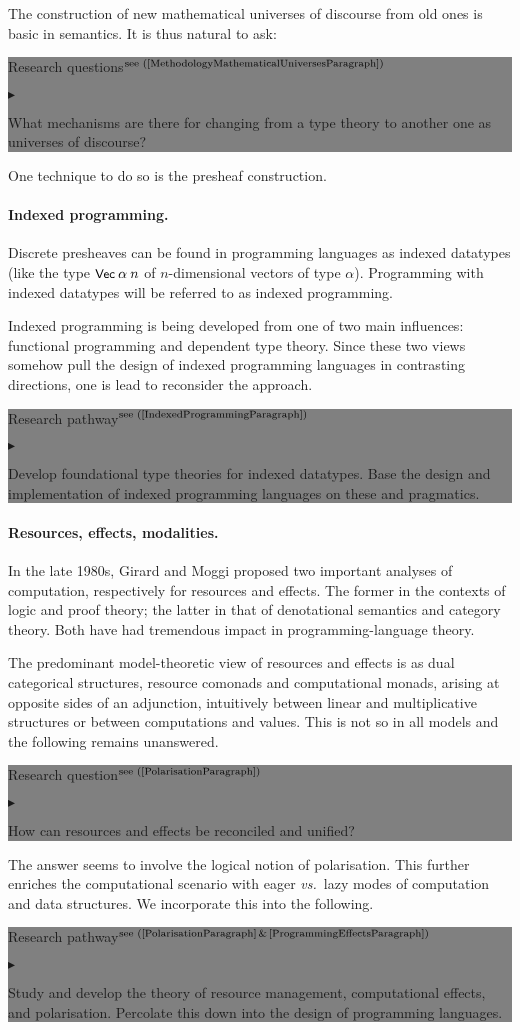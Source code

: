 \documentclass[11pt,twocolumn]{article}
\newenvironment{btritemize}
  {\begin{list}{\btr}
  {\setlength{\topsep}{2pt}
   \setlength{\partopsep}{2pt}
   \setlength{\itemsep}{2.5pt}
   \setlength{\parsep}{2.5pt}
   \setlength{\leftmargin}{1em}
   \setlength{\labelwidth}{.5em}}}
  {\end{list}}
\newcommand{\mytextsf}[1]{\textsf{\small #1}}
\newcommand{\vs}{\emph{vs.}}
\newcommand{\btr}{$\blacktriangleright$}
\newcommand{\reqpsize}{8.113395cm}%
\newcommand{\req}[2]{\begin{center}\colorbox{grey}{\begin{minipage}{\reqpsize} 
  \mytextsf{Research question}\hfill$^{\mbox{\scriptsize see (#1) }}$\\[-5.5mm]
  \begin{btritemize}
  \item #2
  \end{btritemize}
\end{minipage}}\end{center}}
\newcommand{\reqs}[2]{\begin{center}\colorbox{grey}{\begin{minipage}{\reqpsize}
  \mytextsf{Research questions}\hfill$^{\mbox{\scriptsize see (#1) }}$\\[-5.5mm]
  \begin{btritemize}
  \item #2
  \end{btritemize}
\end{minipage}}\end{center}}
\newcommand{\rep}[2]{\begin{center}\colorbox{grey}{\begin{minipage}{\reqpsize}
  \mytextsf{Research pathway}\hfill$^{\mbox{\scriptsize see (#1) }}$\\[-5.5mm]
  \begin{btritemize}
  \item #2
  \end{btritemize}
\end{minipage}}\end{center}}
\begin{document}
The construction of new mathematical universes of discourse from old ones is
basic in semantics.  It is thus natural to ask:
\reqs{\ref{MethodologyMathematicalUniversesParagraph}}
  {What mechanisms are there for changing from a type theory to another one
    as universes of discourse? 
%
}
%
One technique to do so is the presheaf construction.  

\paragraph*{Indexed programming.}

Discrete %
pre\-sheaves can be found in programming languages as indexed data\-types
(like the type $\mbox{\small$\mathsf{Vec}$}\:\alpha\:n$ of
\mbox{$n$-dimensional} vectors of type $\alpha$).  Programming with indexed
datatypes will be referred to as indexed programming.  

Indexed programming is being developed from one of two main influences:
functional programming and dependent type theory.  
Since %
these two views somehow pull the design of indexed programming languages in
contrasting directions, one is lead to reconsider the approach.
\rep{\ref{IndexedProgrammingParagraph}} 
  {Develop foundational type theories for indexed datatypes.  
   Base the design and implementation of indexed programming languages on
   these and pragmatics.}

\paragraph*{Resources, effects, modalities.}

In the late 1980s, 
Girard %
and Moggi %
proposed two important analyses of computation, respectively for resources and
effects.  The former in the contexts of logic and proof theory; the latter in
that of denotational semantics and category theory.  Both have had tremendous
impact in programming-language theory.  

The predominant model-theoretic view of resources and effects is as dual
categorical structures, resource comonads and computational monads, arising at
opposite sides of an adjunction, intuitively between linear and multiplicative
structures or between computations and values.  This is not so in all models
and the following remains unanswered.
%
\req{\ref{PolarisationParagraph}}
  {How can resources and effects be reconciled and unified?}
%
The answer seems to involve the logical notion of
polarisation. %
This further enriches the computational scenario with eager \vs~lazy modes of
computation and data structures.  We incorporate this into the following.
%
\rep{\ref{PolarisationParagraph}\,\&\,\ref{ProgrammingEffectsParagraph}}
  {Study and develop the theory of resource management, computational
    effects, and polarisation.  Percolate this down into the design of
    programming languages.}
\end{document}
